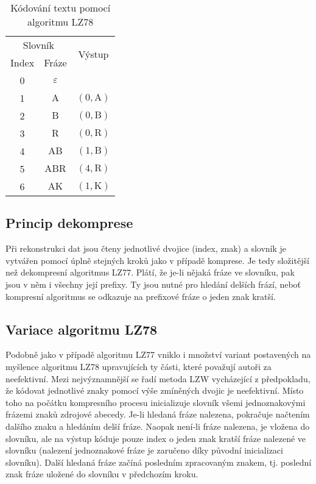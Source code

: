 \begin{table}[!htb]
\centering
\begin{tabular}{|c|c|c|}
\hline
\multicolumn{2}{|c|}{Slovník} & \multirow{2}{*}{Výstup}\\
Index & Fráze & \\
\hline
0 & $\varepsilon$ & \\
1 & $\mathrm{A}$ & $(0,\mathrm{A})$\\
2 & $\mathrm{B}$ & $(0,\mathrm{B})$\\
3 & $\mathrm{R}$ & $(0,\mathrm{R})$\\
4 & $\mathrm{AB}$ & $(1,\mathrm{B})$\\
5 & $\mathrm{ABR}$ & $(4,\mathrm{R})$\\
6 & $\mathrm{AK}$ & $(1,\mathrm{K})$\\
\hline
\end{tabular}
\caption{Kódování textu pomocí algoritmu LZ78}
\label{LZ78tabulka}
\end{table}

\subsection{Princip dekomprese}
Při rekonstrukci dat jsou čteny jednotlivé dvojice (index, znak) a slovník je vytvářen pomocí úplně stejných kroků jako v případě komprese. Je tedy složitější než dekompresní algoritmus LZ77. Plátí, že je-li nějaká fráze ve slovníku, pak jsou v něm i všechny její prefixy. Ty jsou nutné pro hledání delších frází, neboť kompresní algoritmus se odkazuje na prefixové fráze o jeden znak kratší.

\subsection{Variace algoritmu LZ78}
Podobně jako v případě algoritmu LZ77 vniklo i množství variant postavených na myšlence algoritmu LZ78 upravujících ty části, které považují autoři za neefektivní. Mezi nej\-vý\-zna\-mně\-jší se řadí metoda LZW vycházející z předpokladu, že kódovat jednotlivé znaky pomocí výše zmíněných dvojic je neefektivní. Místo toho na počátku kompresního procesu inicializuje slovník všemi jednoznakovými frázemi znaků zdrojové abecedy. Je-li hledaná fráze nalezena, pokračuje načtením dalšího znaku a hledáním delší fráze. Naopak není-li fráze nalezena, je vložena do slovníku, ale na výstup kóduje pouze index o jeden znak kratší fráze nalezené ve slovníku (nalezení jednoznakové fráze je zaručeno díky původní inicializaci slovníku). Další hledaná fráze začíná posledním zpracovaným znakem, tj. poslední znak fráze uložené do slovníku v předchozím kroku.